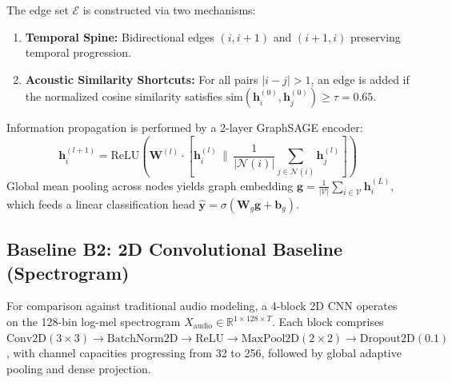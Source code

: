 \documentclass{article}
\begin{document}
The edge set $\mathcal{E}$ is constructed via two mechanisms:
\begin{enumerate}
    \item \textbf{Temporal Spine:} Bidirectional edges $(i, i+1)$ and $(i+1, i)$ preserving temporal progression.
    \item \textbf{Acoustic Similarity Shortcuts:} For all pairs $|i - j| > 1$, an edge is added if the normalized cosine similarity satisfies $\text{sim}(\mathbf{h}_i^{(0)}, \mathbf{h}_j^{(0)}) \ge \tau = 0.65$.
\end{enumerate}

Information propagation is performed by a 2-layer GraphSAGE encoder:
\begin{equation}
    \mathbf{h}_i^{(l+1)} = \text{ReLU}\left( \mathbf{W}^{(l)} \cdot \left[ \mathbf{h}_i^{(l)} \,\|\, \frac{1}{|\mathcal{N}(i)|} \sum_{j \in \mathcal{N}(i)} \mathbf{h}_j^{(l)} \right] \right)
\end{equation}
Global mean pooling across nodes yields graph embedding $\mathbf{g} = \frac{1}{|\mathcal{V}|} \sum_{i \in \mathcal{V}} \mathbf{h}_i^{(L)}$, which feeds a linear classification head $\hat{\mathbf{y}} = \sigma(\mathbf{W}_g \mathbf{g} + \mathbf{b}_g)$.

\subsection{Baseline B2: 2D Convolutional Baseline (Spectrogram)}
For comparison against traditional audio modeling, a 4-block 2D CNN operates on the 128-bin log-mel spectrogram $X_{\text{audio}} \in \mathbb{R}^{1 \times 128 \times T}$. Each block comprises $\text{Conv2D}(3\times 3) \to \text{BatchNorm2D} \to \text{ReLU} \to \text{MaxPool2D}(2\times 2) \to \text{Dropout2D}(0.1)$, with channel capacities progressing from 32 to 256, followed by global adaptive pooling and dense projection.
\end{document}
